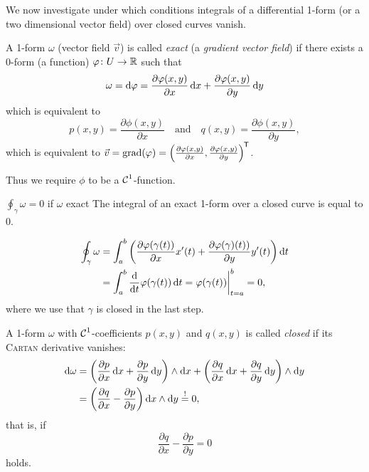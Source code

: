 \documentclass[a4paper,english]{article}
\begin{document}
We now investigate under which conditions integrals of a differential 1-form (or a two dimensional vector field) over closed curves vanish.

\begin{defn}
A 1-form $\omega$ (vector field $\vec{v}$) is called \emph{exact} (a \emph{gradient vector field}) if there exists a 0-form (a function) $\varphi\colon U \to \operatorname{\mathbb{R}}$ such that
\begin{equation*}
    \omega
    = \mathop{}\!\mathrm{d}{\varphi}
    = \frac{\partial \varphi(x,y)}{\partial x} \mathop{}\!\mathrm{d}{x} + \frac{\partial \varphi(x,y)}{\partial y} \mathop{}\!\mathrm{d}{y}
\end{equation*}
which is equivalent to
\begin{equation*}
    p(x, y)
    = \frac{\partial \phi(x,y)}{\partial x}
    \quad \text{and} \quad q(x, y) = \frac{\partial \phi(x,y)}{\partial y},
\end{equation*}
which is equivalent to $\vec{v} = \operatorname{grad}(\varphi) = \left(\frac{\partial \varphi(x,y)}{\partial x}, \frac{\partial \varphi(x,y)}{\partial y}\right)^{\mkern-1.5mu\mathsf{T}}$.
\end{defn}
Thus we require $\phi$ to be a $\operatorname{\mathcal{C}}^1$-function.

\begin{thm}{$\oint_{\gamma} \omega = 0$ if $\omega$ exact}{}
    The integral of an exact 1-form over a closed curve is equal to $0$.
\end{thm}

\begin{pr}
    \begin{align*}
        \oint_{\gamma} \omega
        & = \int_{a}^{b} \left(\frac{\partial \varphi(\gamma(t))}{\partial x}  x'(t) + \frac{\partial \varphi(\gamma)(t))}{\partial y} y'(t)\right) \mathop{}\!\mathrm{d}{t} \\
        & = \int_{a}^{b} \frac{\mathop{}\!\mathrm{d}}{\mathop{}\!\mathrm{d}{t}} \varphi(\gamma(t)) \mathop{}\!\mathrm{d}{t}
        = \varphi(\gamma(t)) \bigg|_{t = a}^{b}
        = 0,
    \end{align*}
    where we use that $\gamma$ is closed in the last step.
\end{pr}

\begin{defn} \label{defn:closed}
    A 1-form $\omega$ with $\operatorname{\mathcal{C}}^1$-coefficients $p(x, y)$ and $q(x, y)$ is called \emph{closed }if its \textsc{Cartan} derivative vanishes:
    \begin{align*}
        \diff{\omega}
        & = \left( \frac{\partial p}{\partial x} \diff{x} + \frac{\partial p}{\partial y} \diff{y}\right) \wedge \diff{x}
        + \left( \frac{\partial q}{\partial x} \diff{x} + \frac{\partial q}{\partial y} \diff{y}\right) \wedge \diff{y} \\
        & = \left( \frac{\partial q}{\partial x} - \frac{\partial p}{\partial y}\right) \diff{x} \wedge \diff{y}
        \overset{!}{=} 0,
    \end{align*}
    that is, if 
    \begin{equation*}
         \frac{\partial q}{\partial x} - \frac{\partial p}{\partial y}
         = 0
    \end{equation*}
    holds.
\end{defn}
\end{document}
